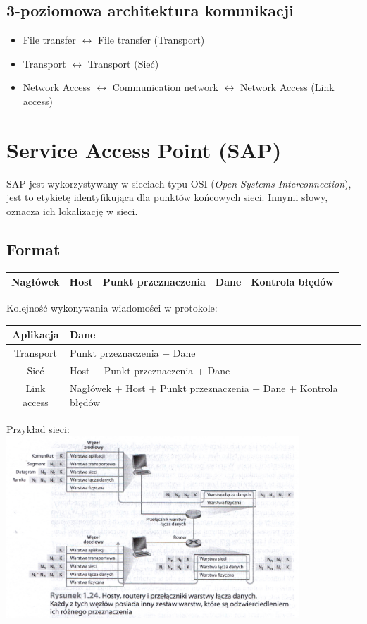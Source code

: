 \documentclass[a4paper,twoside]{article}
\begin{document}
	\subsection{3-poziomowa architektura komunikacji}
	\begin{itemize}
		\item File transfer $\longleftrightarrow$ File transfer (Transport)
		\item Transport $\longleftrightarrow$ Transport (Sieć)
		\item Network Access $\longleftrightarrow$ Communication network $\longleftrightarrow$ Network Access (Link access)
	\end{itemize}
\section{Service Access Point (SAP)}
SAP jest wykorzystywany w sieciach typu OSI (\emph{Open Systems Interconnection}), jest to etykietę identyfikująca dla punktów końcowych sieci. Innymi słowy, oznacza ich lokalizację w sieci.
\subsection{Format}
\begin{table}[h]
	\begin{tabular}{|c|c|c|c|c|}
		\hline
		Nagłówek & Host & Punkt przeznaczenia & Dane & Kontrola błędów \\ \hline
	\end{tabular}
\end{table}
Kolejność wykonywania wiadomości w protokole:
\begin{table}[h]
	\begin{tabular}{|c|l|}
		\hline
		Aplikacja	& Dane								\\ \hline
		Transport	& Punkt przeznaczenia + Dane		\\ \hline
		Sieć		& Host + Punkt przeznaczenia + Dane	\\ \hline
		Link access & Nagłówek + Host + Punkt przeznaczenia + Dane + Kontrola błędów \\ \hline
	\end{tabular}
\end{table}
Przykład sieci:\\
\includegraphics[width=11cm]{./images/image01.jpg}
\end{document}
